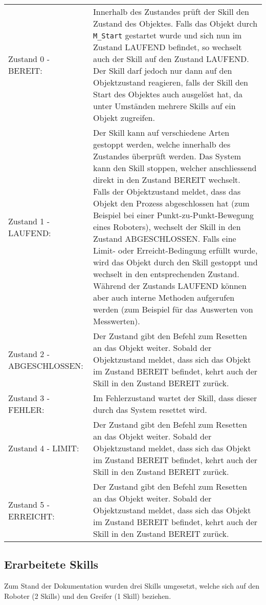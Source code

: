 		\begin{tabularx}{\textwidth}{@{}>{}p{13em} X@{}}
			Zustand 0 - BEREIT: & 
			Innerhalb des Zustandes prüft der Skill den Zustand des Objektes. Falls das Objekt durch \verb|M_Start| gestartet wurde und sich nun im Zustand LAUFEND befindet, so wechselt auch der Skill auf den Zustand  LAUFEND. Der Skill darf jedoch nur dann auf  den Objektzustand reagieren, falls der Skill den Start des Objektes auch ausgelöst hat, da unter Umständen mehrere Skills auf ein Objekt zugreifen. 
			\\
			Zustand 1 - LAUFEND: & 
			Der Skill kann auf verschiedene Arten gestoppt werden, welche innerhalb des Zustandes überprüft werden. Das System kann den Skill stoppen, welcher anschliessend direkt in den Zustand BEREIT wechselt. Falls der Objektzustand meldet, dass das Objekt den Prozess abgeschlossen hat (zum Beispiel bei einer Punkt-zu-Punkt-Bewegung eines Roboters), wechselt der Skill in den Zustand ABGESCHLOSSEN. Falls eine Limit- oder Erreicht-Bedingung erfüllt wurde, wird das Objekt durch den Skill gestoppt und wechselt in den entsprechenden Zustand. Während der Zustands LAUFEND können aber auch interne Methoden aufgerufen werden (zum Beispiel für das Auswerten von Messwerten).
			\\
			Zustand 2 - ABGESCHLOSSEN: & 
			Der Zustand gibt den Befehl zum Resetten an das Objekt weiter. Sobald der Objektzustand meldet, dass sich das Objekt im Zustand BEREIT befindet, kehrt auch der Skill in den Zustand BEREIT zurück. 
			\\
			Zustand 3 - FEHLER: & 
			Im Fehlerzustand wartet der Skill, dass dieser durch das System resettet wird. 
			\\
			Zustand 4 - LIMIT: & 
			Der Zustand gibt den Befehl zum Resetten an das Objekt weiter. Sobald der Objektzustand meldet, dass sich das Objekt im Zustand BEREIT befindet, kehrt auch der Skill in den Zustand BEREIT zurück.
			\\
			Zustand 5 - ERREICHT: & 
			Der Zustand gibt den Befehl zum Resetten an das Objekt weiter. Sobald der Objektzustand meldet, dass sich das Objekt im Zustand BEREIT befindet, kehrt auch der Skill in den Zustand BEREIT zurück.
			\\
		\end{tabularx}
		
		\newpage
	
	\subsection{Erarbeitete Skills} \label{Skills_Erarbeitet}
		Zum Stand der Dokumentation wurden drei Skills umgesetzt, welche sich auf den Roboter (2 Skills) und den Greifer (1 Skill) beziehen. 	
		

